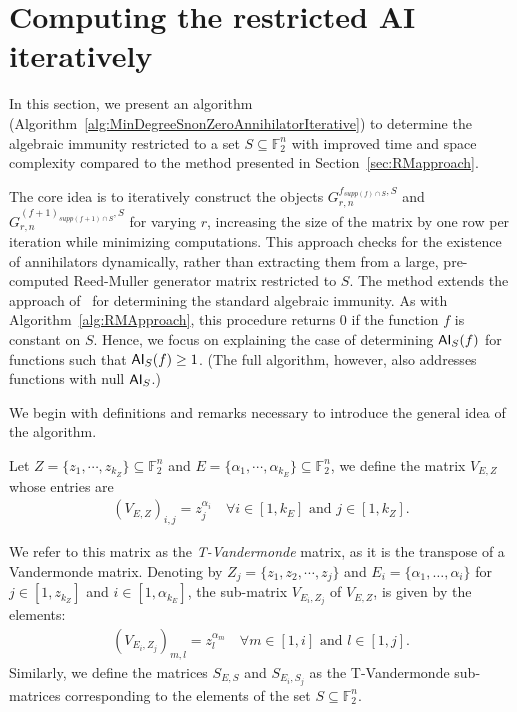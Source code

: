 \documentclass[11pt]{llncs}
\begin{document}
\section{Computing the restricted AI iteratively}\label{sec:IterativeApproach}

In this section, we present an algorithm (Algorithm~\ref{alg:MinDegreeSnonZeroAnnihilatorIterative}) to determine the algebraic immunity restricted to a set $S \subseteq \mathbb{F}_2^n$ with improved time and space complexity compared to the method presented in Section~\ref{sec:RMapproach}. 

The core idea is to iteratively construct the objects $G_{r,n}^{f_{supp\left(f\right) \cap S},S}$ and $G_{r,n}^{\left(f+ 1\right)_{supp\left(f+ 1\right) \cap S},S}$ for varying $r$, increasing the size of the matrix by one row per iteration while minimizing computations. 
This approach checks for the existence of annihilators dynamically, rather than extracting them from a large, pre-computed Reed-Muller generator matrix restricted to $S$. The method extends the approach of~\cite{EC:ACGKMR06} for determining the standard algebraic immunity.
As with Algorithm~\ref{alg:RMApproach}, this procedure returns $0$ if the function $f$ is constant on $S$. Hence, we focus on explaining the case of determining $\mathsf{AI}_S(f)$ for functions such that $\mathsf{AI}_S(f) \geq 1$. (The full algorithm, however, also addresses functions with null $\mathsf{AI}_S$.)

We begin with definitions and remarks necessary to introduce the general idea of the algorithm.




\begin{definition}\label{def:tVandermonde}
    Let $Z = \{z_1, \cdots, z_{k_Z}\} \subseteq \mathbb{F}_2^n$ and $E = \{\alpha_1, \cdots, \alpha_{k_E}\}\subseteq \mathbb{F}_2^n$, we define the matrix $V_{E,Z}$ whose entries are
    \begin{align*}
        \left(V_{E,Z}\right)_{i,j} = z_j^{\alpha_i} \quad \forall i\in[1,k_E] \mbox{ and } j\in[1, k_Z].
    \end{align*}
    
  We refer to this matrix as the \textit{T-Vandermonde} matrix, as it is the transpose of a Vandermonde matrix.
    Denoting by $Z_j = \{z_1, z_2, \cdots, z_j\}$ and $E_i = \{\alpha_1, \dots, \alpha_i\}$ for $j\in[1,z_{k_Z}]$ and $i\in[1,\alpha_{k_E}]$, the sub-matrix $V_{E_i, Z_j}$ of $V_{E,Z}$, is given by the elements:
    \begin{align*}
        \left(V_{E_i,Z_j}\right)_{m,l} = z_l^{\alpha_m} \quad \forall m\in[1,i] \mbox{ and } l\in[1, j].
    \end{align*}
    Similarly, we define the matrices $S_{E,S}$ and $S_{E_i, S_j}$ as the T-Vandermonde sub-matrices corresponding to the elements of the set $S\subseteq \mathbb{F}_2^n$.
\end{definition}
\end{document}
